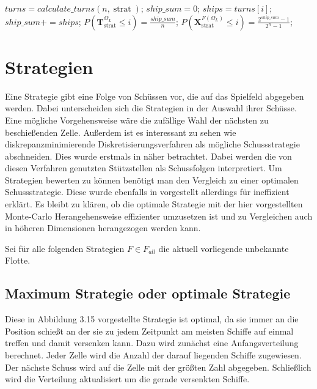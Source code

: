 \documentclass[a4paper,12pt]{llncs}
\numberwithin{equation}{section}
\DeclareMathOperator{\strat}{strat}
\begin{document}
\begin{tcolorbox}
	\begin{algorithmic}[H]
		\Function{evaluate\_strategy}{$n, \strat$}{:}
		\State $turns = calculate\_turns(n, \strat)$;
		\State $ship\_sum=0$;
		\State $ships=turns[i]$;
		\State $ship\_sum += ships$;
		\State $P(\mathbf{T}^{\Omega_L}_{\strat} \leq i)=\frac{ship\_sum}{n}$;
		\State $P(\mathbf{X}^{F(\Omega_L)}_{\strat} \leq i)=\frac{2^{ship\_sum} - 1}{2^{n} - 1}$;
		\EndFor
		\EndFunction
	\end{algorithmic}
\end{tcolorbox}

\section{Strategien}

Eine Strategie gibt eine Folge von Schüssen vor, die auf das Spielfeld abgegeben werden. Dabei unterscheiden sich die Strategien in der Auswahl ihrer Schüsse. Eine mögliche Vorgehensweise wäre die zufällige Wahl der nächsten zu beschießenden Zelle. Außerdem ist es interessant zu sehen wie diskrepanzminimierende Diskretisierungsverfahren als mögliche Schussstrategie abschneiden. Dies wurde erstmals in \cite{M13} näher betrachtet. Dabei werden die von diesen Verfahren genutzten Stützstellen als Schussfolgen interpretiert. Um Strategien bewerten zu können benötigt man den Vergleich zu einer optimalen Schussstrategie. Diese wurde ebenfalls in \cite{M13} vorgestellt allerdings für ineffizient erklärt. Es bleibt zu klären, ob die optimale Strategie mit der hier vorgestellten Monte-Carlo Herangehensweise effizienter umzusetzen ist und zu Vergleichen auch in höheren Dimensionen herangezogen werden kann.

Sei für alle folgenden Strategien $F\in F_{all}$ die aktuell vorliegende unbekannte Flotte.

\subsection{Maximum Strategie oder optimale Strategie}

Diese in \cite{M13} Abbildung 3.15 vorgestellte Strategie ist optimal, da sie immer an die Position schießt an der sie zu jedem Zeitpunkt am meisten Schiffe auf einmal treffen und damit versenken kann. Dazu wird zunächst eine Anfangsverteilung berechnet. Jeder Zelle wird die Anzahl der darauf liegenden Schiffe zugewiesen. Der nächste Schuss wird auf die Zelle mit der größten Zahl abgegeben. Schließlich wird die Verteilung aktualisiert um die gerade versenkten Schiffe.
\end{document}
